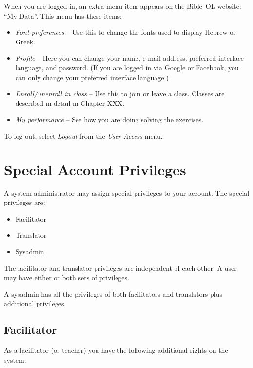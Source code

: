 \documentclass[11pt,oneside,a4paper]{memoir}
\begin{document}
When you are logged in, an extra menu item appears on the Bible~OL website: ``My Data''. This menu
has these items:

\begin{itemize}
\item \emph{Font preferences} -- Use this to change the fonts used to display Hebrew or Greek.
\item \emph{Profile} -- Here you can change your name, e-mail address, preferred interface language,
  and password. (If you are logged in via Google or Facebook, you can only change your preferred
  interface language.)
\item \emph{Enroll/unenroll in class} -- Use this to join or leave a class. Classes are described in
  detail in Chapter XXX.
\item \emph{My performance} -- See how you are doing solving the exercises.
\end{itemize}


To log out, select \emph{Logout} from the \emph{User Access} menu.


\section{Special Account Privileges}

A system administrator may assign special privileges to your account. The special privileges are:

\begin{itemize}
\item Facilitator
\item Translator
\item Sysadmin
\end{itemize}

The facilitator and translator privileges are independent of each other. A user may have either or
both sets of privileges.

A sysadmin has all the privileges of both facilitators and translators plus additional privileges.



\subsection{Facilitator}

As a facilitator (or teacher) you have the following additional rights on the system:
\end{document}
